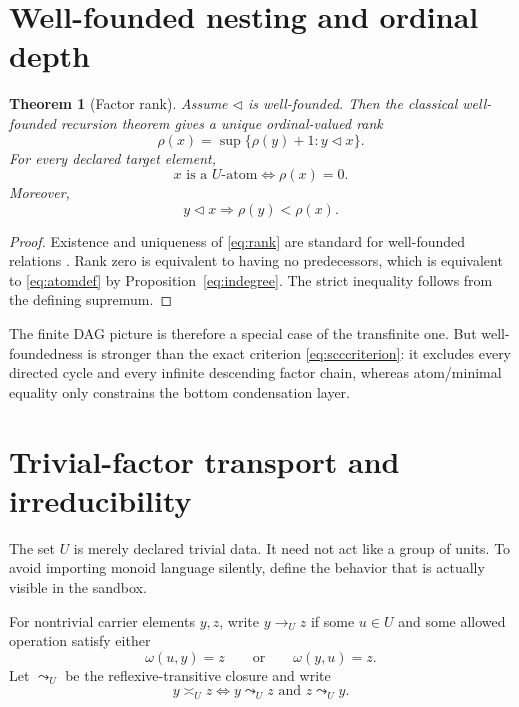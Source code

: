 \documentclass[11pt]{article}
\newtheorem{theorem}{Theorem}[section]
\theoremstyle{definition}
\theoremstyle{remark}
\begin{document}
\section{Well-founded nesting and ordinal depth}

\begin{theorem}[Factor rank]
Assume \(\triangleleft\) is well-founded. Then the classical well-founded recursion theorem gives a unique ordinal-valued rank
\begin{equation}
\rho(x)=\sup\{\rho(y)+1:y\triangleleft x\}.
\label{eq:rank}
\end{equation}
For every declared target element,
\begin{equation}
\boxed{x\text{ is a }U\text{-atom}\iff\rho(x)=0.}
\label{eq:rankzero}
\end{equation}
Moreover,
\[
y\triangleleft x\Longrightarrow\rho(y)<\rho(x).
\]
\end{theorem}

\begin{proof}
Existence and uniqueness of \eqref{eq:rank} are standard for well-founded relations \cite{Jech2003}. Rank zero is equivalent to having no predecessors, which is equivalent to \eqref{eq:atomdef} by Proposition~\ref{eq:indegree}. The strict inequality follows from the defining supremum.
\end{proof}

The finite DAG picture is therefore a special case of the transfinite one. But well-foundedness is stronger than the exact criterion \eqref{eq:scccriterion}: it excludes every directed cycle and every infinite descending factor chain, whereas atom/minimal equality only constrains the bottom condensation layer.

\section{Trivial-factor transport and irreducibility}

The set \(U\) is merely declared trivial data. It need not act like a group of units. To avoid importing monoid language silently, define the behavior that is actually visible in the sandbox.

For nontrivial carrier elements \(y,z\), write \(y\to_U z\) if some \(u\in U\) and some allowed operation satisfy either
\[
\omega(u,y)=z
\qquad\text{or}\qquad
\omega(y,u)=z.
\]
Let \(\leadsto_U\) be the reflexive-transitive closure and write
\[
y\asymp_U z
\iff
y\leadsto_U z\text{ and }z\leadsto_U y.
\]
\end{document}
